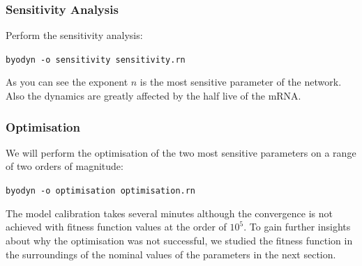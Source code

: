 \documentclass[a4paper, 11pt]{article}
\begin{document}
  \subsubsection{Sensitivity Analysis}
  Perform the sensitivity analysis:
  \begin{center}
    \texttt{byodyn -o sensitivity sensitivity.rn}
  \end{center}
  As you can see the exponent $n$ is the most sensitive parameter of the network.
  Also the dynamics are greatly affected by the half live of the mRNA.
  \subsubsection{Optimisation} \label{repressilatorOptimisation}
  We will perform the optimisation of the two most sensitive parameters on a range of two orders of magnitude:
  \begin{center}
    \texttt{byodyn -o optimisation optimisation.rn}
  \end{center}
  The model calibration takes several minutes although the convergence is not achieved with fitness function values at the order of $10^{5}$.
  To gain further insights about why the optimisation was not successful, we studied the fitness function in the surroundings of the nominal values of the parameters in the next section.
\end{document}
